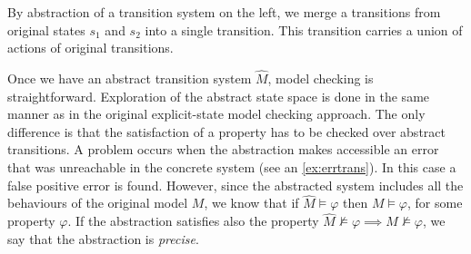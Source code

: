 \begin{example} \label{ex:errtrans}
By abstraction of a transition system on the left, we merge a transitions from
original states $s_1$ and $s_2$ into a single transition. This transition
carries a union of actions of original transitions.
\begin{center}
\end{center}
\end{example}

Once we have an abstract transition system $\widehat{M}$, model checking is
straightforward. Exploration of the abstract state space is done in the same
manner as in the original explicit-state model checking approach. The only
difference is that the satisfaction of a property has to be checked over
abstract transitions. A problem occurs when the abstraction makes accessible an
error that was unreachable in the concrete system (see an
\autoref{ex:errtrans}).
In this case a false positive error is found. However, since the abstracted system
includes all the behaviours of the original model $M$, we know that if
$\widehat{M} \models \varphi$ then $M \models \varphi$, for some property
$\varphi$. If the abstraction satisfies also the property $\widehat{M}
\not\models \varphi \implies M \not\models \varphi$, we say that the abstraction
is \emph{precise}.
